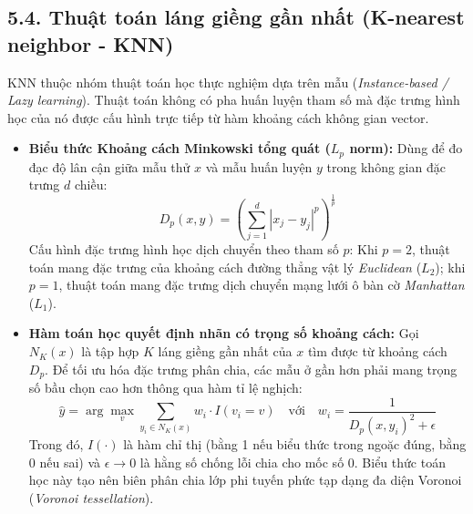 \documentclass[11pt,a4paper]{article}
\begin{document}
\subsection{5.4. Thuật toán láng giềng gần nhất (K-nearest neighbor - KNN)}
KNN thuộc nhóm thuật toán học thực nghiệm dựa trên mẫu (\textit{Instance-based / Lazy learning}). Thuật toán không có pha huấn luyện tham số mà đặc trưng hình học của nó được cấu hình trực tiếp từ hàm khoảng cách không gian vector.
\begin{itemize}
    \item \textbf{Biểu thức Khoảng cách Minkowski tổng quát ($L_p$ norm):} Dùng để đo đạc độ lân cận giữa mẫu thử $x$ và mẫu huấn luyện $y$ trong không gian đặc trưng $d$ chiều:
    \begin{equation}
        D_p(x, y) = \left( \sum_{j=1}^{d} |x_j - y_j|^p \right)^{\frac{1}{p}}
    \end{equation}
    Cấu hình đặc trưng hình học dịch chuyển theo tham số $p$: Khi $p=2$, thuật toán mang đặc trưng của khoảng cách đường thẳng vật lý \textit{Euclidean} ($L_2$); khi $p=1$, thuật toán mang đặc trưng dịch chuyển mạng lưới ô bàn cờ \textit{Manhattan} ($L_1$).
    \item \textbf{Hàm toán học quyết định nhãn có trọng số khoảng cách:} Gọi $N_K(x)$ là tập hợp $K$ láng giềng gần nhất của $x$ tìm được từ khoảng cách $D_p$. Để tối ưu hóa đặc trưng phân chia, các mẫu ở gần hơn phải mang trọng số bầu chọn cao hơn thông qua hàm tỉ lệ nghịch:
    \begin{equation}
        \hat{y} = \arg\max_{v} \sum_{y_i \in N_K(x)} w_i \cdot I(v_i = v) \quad \text{với} \quad w_i = \frac{1}{D_p(x, y_i)^2 + \epsilon}
    \end{equation}
    Trong đó, $I(\cdot)$ là hàm chỉ thị (bằng 1 nếu biểu thức trong ngoặc đúng, bằng 0 nếu sai) và $\epsilon \rightarrow 0$ là hằng số chống lỗi chia cho mốc số 0. Biểu thức toán học này tạo nên biên phân chia lớp phi tuyến phức tạp dạng đa diện Voronoi (\textit{Voronoi tessellation}).
\end{itemize}
\end{document}
